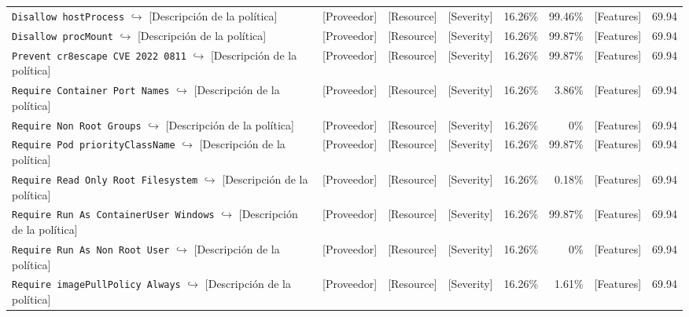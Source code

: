 \begin{table}[ht]
\begin{tabular}{lcccrrrr}
\makecell[l]{\texttt{Disallow hostProcess} \\ $\hookrightarrow$ [Descripción de la política]} & [Proveedor] & [Resource] & [Severity] & 16.26\% & 99.46\% & [Features] & 69.94 \\
\makecell[l]{\texttt{Disallow procMount} \\ $\hookrightarrow$ [Descripción de la política]} & [Proveedor] & [Resource] & [Severity] & 16.26\% & 99.87\% & [Features] & 69.94 \\
\makecell[l]{\texttt{Prevent cr8escape CVE 2022 0811} \\ $\hookrightarrow$ [Descripción de la política]} & [Proveedor] & [Resource] & [Severity] & 16.26\% & 99.87\% & [Features] & 69.94 \\
\makecell[l]{\texttt{Require Container Port Names} \\ $\hookrightarrow$ [Descripción de la política]} & [Proveedor] & [Resource] & [Severity] & 16.26\% & 3.86\% & [Features] & 69.94 \\
\makecell[l]{\texttt{Require Non Root Groups} \\ $\hookrightarrow$ [Descripción de la política]} & [Proveedor] & [Resource] & [Severity] & 16.26\% & 0\% & [Features] & 69.94 \\
\makecell[l]{\texttt{Require Pod priorityClassName} \\ $\hookrightarrow$ [Descripción de la política]} & [Proveedor] & [Resource] & [Severity] & 16.26\% & 99.87\% & [Features] & 69.94 \\
\makecell[l]{\texttt{Require Read Only Root Filesystem} \\ $\hookrightarrow$ [Descripción de la política]} & [Proveedor] & [Resource] & [Severity] & 16.26\% & 0.18\% & [Features] & 69.94 \\
\makecell[l]{\texttt{Require Run As ContainerUser Windows} \\ $\hookrightarrow$ [Descripción de la política]} & [Proveedor] & [Resource] & [Severity] & 16.26\% & 99.87\% & [Features] & 69.94 \\
\makecell[l]{\texttt{Require Run As Non Root User} \\ $\hookrightarrow$ [Descripción de la política]} & [Proveedor] & [Resource] & [Severity] & 16.26\% & 0\% & [Features] & 69.94 \\
\makecell[l]{\texttt{Require imagePullPolicy Always} \\ $\hookrightarrow$ [Descripción de la política]} & [Proveedor] & [Resource] & [Severity] & 16.26\% & 1.61\% & [Features] & 69.94 \\

\end{tabular}
\end{table}
